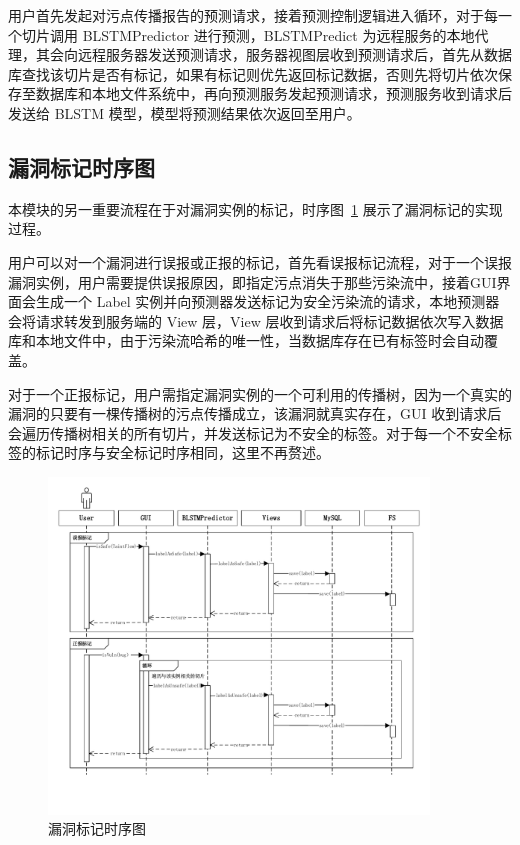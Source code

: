 用户首先发起对污点传播报告的预测请求，接着预测控制逻辑进入循环，对于每一个切片调用 BLSTMPredictor 进行预测，BLSTMPredict 为远程服务的本地代理，其会向远程服务器发送预测请求，服务器视图层收到预测请求后，首先从数据库查找该切片是否有标记，如果有标记则优先返回标记数据，否则先将切片依次保存至数据库和本地文件系统中，再向预测服务发起预测请求，预测服务收到请求后发送给 BLSTM 模型，模型将预测结果依次返回至用户。\\

\subsection{漏洞标记时序图}

本模块的另一重要流程在于对漏洞实例的标记，时序图~\ref{labelTime} 展示了漏洞标记的实现过程。

用户可以对一个漏洞进行误报或正报的标记，首先看误报标记流程，对于一个误报漏洞实例，用户需要提供误报原因，即指定污点消失于那些污染流中，接着GUI界面会生成一个 Label 实例并向预测器发送标记为安全污染流的请求，本地预测器会将请求转发到服务端的 View 层，View 层收到请求后将标记数据依次写入数据库和本地文件中，由于污染流哈希的唯一性，当数据库存在已有标签时会自动覆盖。

对于一个正报标记，用户需指定漏洞实例的一个可利用的传播树，因为一个真实的漏洞的只要有一棵传播树的污点传播成立，该漏洞就真实存在，GUI 收到请求后会遍历传播树相关的所有切片，并发送标记为不安全的标签。对于每一个不安全标签的标记时序与安全标记时序相同，这里不再赘述。


\begin{figure}[htbp]
    \centering
    \includegraphics[width=0.9\textwidth]{FIGs/chapter4/labelTime.pdf}
    \caption{漏洞标记时序图}\label{labelTime}
\end{figure}

